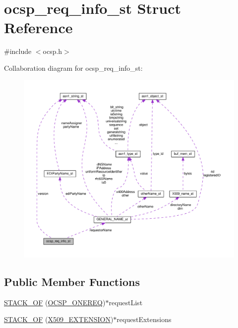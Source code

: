 \hypertarget{structocsp__req__info__st}{}\section{ocsp\+\_\+req\+\_\+info\+\_\+st Struct Reference}
\label{structocsp__req__info__st}


{\ttfamily \#include $<$ocsp.\+h$>$}



Collaboration diagram for ocsp\+\_\+req\+\_\+info\+\_\+st\+:
\nopagebreak
\begin{figure}[H]
\begin{center}
\leavevmode
\includegraphics[width=350pt]{structocsp__req__info__st__coll__graph}
\end{center}
\end{figure}
\subsection*{Public Member Functions}
\begin{DoxyCompactItemize}
\item 
\hyperlink{structocsp__req__info__st_ad3f99369c4dc287eff1f44a8754f9826}{S\+T\+A\+C\+K\+\_\+\+OF} (\hyperlink{ocsp_8h_a43e15d6fbd17f20cf0b3095cd123d234}{O\+C\+S\+P\+\_\+\+O\+N\+E\+R\+EQ})$\ast$request\+List
\item 
\hyperlink{structocsp__req__info__st_a2941bbf871be57d2720eda2a5ef440e0}{S\+T\+A\+C\+K\+\_\+\+OF} (\hyperlink{x509_8h_ab2f7f7dc0ced8684e0cbfc818e408304}{X509\+\_\+\+E\+X\+T\+E\+N\+S\+I\+ON})$\ast$request\+Extensions
\end{DoxyCompactItemize}
